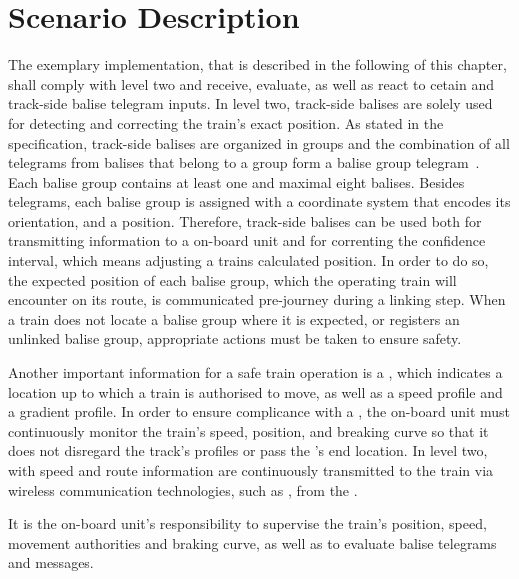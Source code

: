 \section{Scenario Description}
\label{sec:ImpScenarioDescription}
The exemplary implementation, that is described in the following of this chapter, shall comply with  level two and receive, evaluate, as well as react to cetain  and track-side balise telegram inputs.
In  level two, track-side balises are solely used for detecting and correcting the train's exact position.
As stated in the  specification, track-side balises are organized in groups and the combination of all telegrams from balises that belong to a group form a balise group telegram~\cite{ETCS26}.
Each balise group contains at least one and maximal eight balises.
Besides telegrams, each balise group is assigned with a coordinate system that encodes its orientation, and a position.
Therefore, track-side balises can be used both for transmitting information to a on-board unit and for correnting the confidence interval, which means adjusting a trains calculated position.
In order to do so, the expected position of each balise group, which the operating train will encounter on its route, is communicated pre-journey during a linking step.
When a train does not locate a balise group where it is expected, or registers an unlinked balise group, appropriate actions must be taken to ensure safety.

Another important information for a safe train operation is a , which indicates a location up to which a train is authorised to move, as well as a speed profile and a gradient profile.
In order to ensure complicance with a , the on-board unit must continuously monitor the train's speed, position, and breaking curve so that it does not disregard the track's profiles or pass the 's end location.
In  level two,  with speed and route information are continuously transmitted to the train via wireless communication technologies, such as , from the .

It is the on-board unit's responsibility to supervise the train's position, speed, movement authorities and braking curve, as well as to evaluate balise telegrams and  messages.



